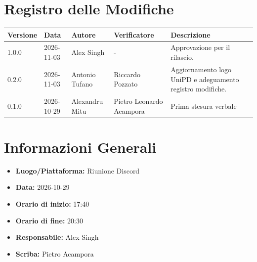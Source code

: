 \documentclass[a4paper, 11pt]{article}
\begin{document}
\newpage

\section*{Registro delle Modifiche}
\vspace{0.5cm}
\begin{center}
\renewcommand{\arraystretch}{1.5}
\begin{tabularx}{\textwidth}{|l|l|l|l|X|}
\hline
\textbf{Versione} & \textbf{Data} & \textbf{Autore} & \textbf{Verificatore} & \textbf{Descrizione} \\ \hline
1.0.0 & 2026-11-03 & Alex Singh & - & Approvazione per il rilascio. \\ \hline
0.2.0 & 2026-11-03 & Antonio Tufano & Riccardo Pozzato & Aggiornamento logo UniPD e adeguamento registro modifiche. \\ \hline
0.1.0 & 2026-10-29 & Alexandru Mitu & Pietro Leonardo Acampora & Prima stesura verbale \\ \hline
\end{tabularx}
\end{center}

\newpage

\tableofcontents
\newpage

\section{Informazioni Generali}
\begin{itemize}
    \item \textbf{Luogo/Piattaforma:} Riunione Discord
    \item \textbf{Data:} 2026-10-29
    \item \textbf{Orario di inizio:} 17:40
    \item \textbf{Orario di fine:} 20:30
    \item \textbf{Responsabile:} Alex Singh
    \item \textbf{Scriba:} Pietro Acampora
\end{itemize}
\end{document}
